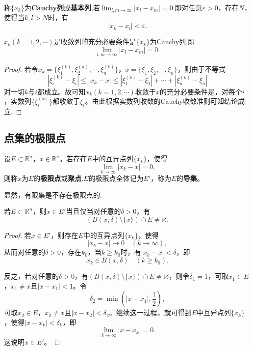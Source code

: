 \documentclass[lang=cn,newtx,10pt,scheme=chinese]{../Template/elegantbook}
\begin{document}
\begin{definition}[Cauchy列]\label{definition:Cauchy列}
  称\(\{x_k\}\)为\textbf{Cauchy列}或\textbf{基本列},若$\lim_{l,m\rightarrow\infty}|x_l - x_m| = 0$.即对任意\(\varepsilon>0\)，存在\(N\)，使得当\(k,l>N\)时，有
\[|x_k - x_l|<\varepsilon.\]
\end{definition}

\begin{theorem}
  \(x_k(k = 1,2,\cdots)\)是收敛列的充分必要条件是\(\{x_k\}\)为Cauchy列,即
\[\lim_{l,m\rightarrow\infty}|x_l - x_m| = 0.\]
\end{theorem}
\begin{proof}
  若令\(x_k=\{\xi_1^{(k)},\xi_2^{(k)},\cdots,\xi_n^{(k)}\}\)，\(x = \{\xi_1,\xi_2,\cdots,\xi_n\}\)，则由于不等式
\[|\xi_i^{(k)} - \xi_i|\leqslant|x_k - x|\leqslant|\xi_1^{(k)} - \xi_1|+\cdots+|\xi_n^{(k)} - \xi_n|\]
对一切\(k\)与\(i\)都成立。故可知\(x_k(k = 1,2,\cdots)\)收敛于\(x\)的充分必要条件是，对每个\(i\)，实数列\(\{\xi_i^{(k)}\}\)都收敛于\(\xi_i\)。由此根据实数列收敛的Cauchy收敛准则可知结论成立.

\end{proof}

\subsection{点集的极限点}

\begin{definition}[极限点与导集]\label{definition:极限点与导集}
设\(E\subset\mathbb{R}^n\)，\(x\in\mathbb{R}^n\)。若存在\(E\)中的互异点列\(\{x_k\}\)，使得
\[\lim_{k\rightarrow\infty}|x_k - x| = 0,\]
则称\(x\)为\(E\)的\textbf{极限点}或\textbf{聚点}.\(E\)的极限点全体记为\(E'\)，称为\(E\)的\textbf{导集}。
\end{definition}
\begin{note}
  显然，有限集是不存在极限点的.
\end{note}

\begin{theorem}[一个点是极限点的充要条件]\label{theorem:一个点是极限点的充要条件}
若\(E\subset\mathbb{R}^n\)，则\(x\in E'\)当且仅当对任意的\(\delta>0\)，有
\[(B(x,\delta)\setminus\{x\})\cap E\neq\varnothing.\]
\end{theorem}
\begin{proof}
  若\(x\in E'\)，则存在\(E\)中的互异点列\(\{x_k\}\)，使得
\[|x_k - x|\to 0\quad(k\to\infty),\]
从而对任意的\(\delta>0\)，存在\(k_0\)，当\(k\geqslant k_0\)时，有\(|x_k - x|<\delta\)，即
\[x_k\in B(x,\delta)\quad(k\geqslant k_0).\]

反之，若对任意的\(\delta>0\)，有\((B(x,\delta)\setminus\{x\})\cap E\neq\varnothing\)，则令\(\delta_1 = 1\)，可取\(x_1\in E\)，\(x_1\neq x\)且\(|x - x_1|<1\)。令
\[\delta_2=\min\left(|x - x_1|,\frac{1}{2}\right),\]
可取\(x_2\in E\)，\(x_2\neq x\)且\(|x - x_2|<\delta_2\)。继续这一过程，就可得到\(E\)中互异点列\(\{x_k\}\)，使得\(|x - x_k|<\delta_k\)，即
\[\lim_{k\to\infty}|x - x_k| = 0.\]
这说明\(x\in E'\)。

\end{proof}
\end{document}
